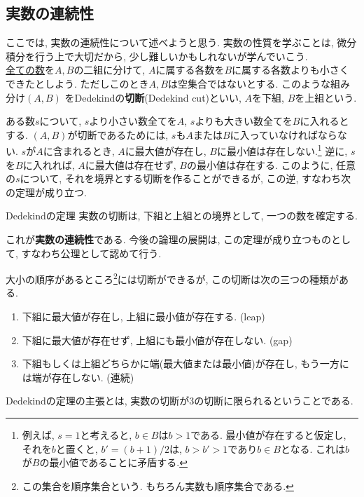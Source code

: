     \clearpage
    \subsection{実数の連続性}
        ここでは, 実数の連続性について述べようと思う. 実数の性質を学ぶことは, 微分積分を行う上で大切だから, 少し難しいかもしれないが学んでいこう.\\

        \underline{全ての数}を$A,B$の二組に分けて, $A$に属する各数を$B$に属する各数よりも小さくできたとしよう. ただしこのとき$A,B$は空集合ではないとする. このような組み分け$(A,B)$
        をDedekindの\textbf{切断}(Dedekind cut)といい, $A$を下組, $B$を上組という.

        ある数$s$について, $s$より小さい数全てを$A$, $s$よりも大きい数全てを$B$に入れるとする. $(A,B)$が切断であるためには, $s$も$A$または$B$に入っていなければならない.
        $s$が$A$に含まれるとき, $A$に最大値が存在し, $B$に最小値は存在しない.\footnote{例えば, $s=1$と考えると, $b\in B$は$b>1$である. 最小値が存在すると仮定し, それを$b$と置くと, 
        $b'=(b+1)/2$は, $b>b'>1$であり$b\in B$となる. これは$b$が$B$の最小値であることに矛盾する.} 逆に, $s$を$B$に入れれば, $A$に最大値は存在せず, $B$の最小値は存在する.
        このように, 任意の$s$について, それを境界とする切断を作ることができるが, この逆, すなわち次の定理が成り立つ.
        \begin{itembox}{Dedekindの定理}
            実数の切断は, 下組と上組との境界として, 一つの数を確定する.
        \end{itembox}
        これが\textbf{実数の連続性}である. 今後の論理の展開は, この定理が成り立つものとして, すなわち公理として認めて行う.

        大小の順序があるところ\footnote{この集合を順序集合という. もちろん実数も順序集合である.}には切断ができるが, この切断は次の三つの種類がある.

        \begin{enumerate}
            \item 下組に最大値が存在し, 上組に最小値が存在する. (leap)
            \item 下組に最大値が存在せず, 上組にも最小値が存在しない. (gap)
            \item 下組もしくは上組どちらかに端(最大値または最小値)が存在し, もう一方には端が存在しない. (連続)
        \end{enumerate}
        Dedekindの定理の主張とは, 実数の切断が3の切断に限られるということである.

